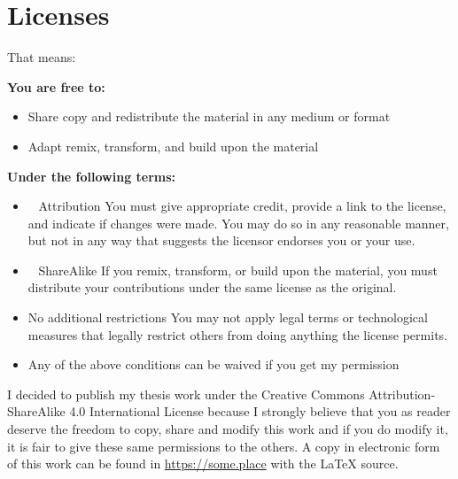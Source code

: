
\pagestyle{empty}
\chapter*{Licenses}

That means:

\textbf{You are free to:}
\begin{itemize}
\item Share \textemdash copy and redistribute the material in any medium or format
\item Adapt \textemdash remix, transform, and build upon the material
\end{itemize}

\textbf{Under the following terms:}
\begin{itemize}
\item \ccAttribution~ Attribution \textemdash You must give appropriate credit, provide a link to the license, and indicate if changes were made. You may do so in any reasonable manner, but not in any way that suggests the licensor endorses you or your use.
\item \ccShareAlike~ ShareAlike \textemdash If you remix, transform, or build upon the material, you must distribute your contributions under the same license as the original.
\item No additional restrictions \textemdash You may not apply legal terms or technological measures that legally restrict others from doing anything the license permits.
\item Any of the above conditions can be waived if you get my permission
\end{itemize}

I decided to publish my thesis work under the Creative Commons Attribution-ShareAlike 4.0 International License because I strongly believe that you as reader deserve the freedom to copy, share and modify this work and if you do modify it, it is fair to give these same permissions to the others. A copy in electronic form of this work can be found in \url{https://some.place} with the \LaTeX{} source.

\clearpage
